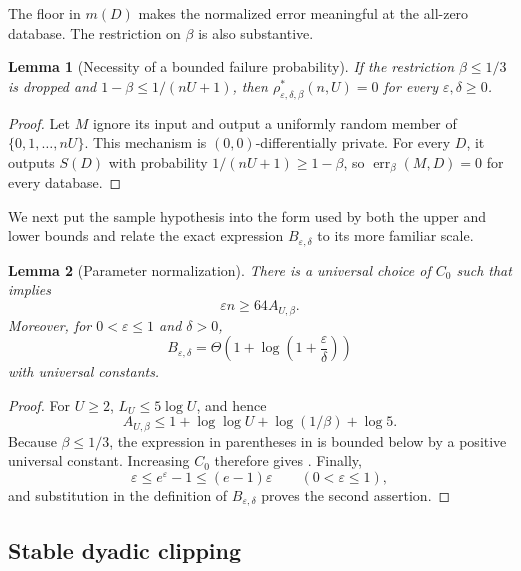 \documentclass[11pt]{article}
\newtheorem{lemma}{Lemma}[section]
\begin{document}
The floor in $m(D)$ makes the normalized error meaningful at the all-zero
database.  The restriction on $\beta$ is also substantive.

\begin{lemma}[Necessity of a bounded failure probability]
\label{lem:beta-counterexample}
If the restriction $\beta\le1/3$ is dropped and
$1-\beta\le1/(nU+1)$, then
$\rho^*_{\varepsilon,\delta,\beta}(n,U)=0$ for every
$\varepsilon,\delta\ge0$.
\end{lemma}

\begin{proof}
Let $M$ ignore its input and output a uniformly random member of
$\{0,1,\ldots,nU\}$.  This mechanism is $(0,0)$-differentially private.
For every $D$, it outputs $S(D)$ with probability
$1/(nU+1)\ge1-\beta$, so
$\operatorname{err}_{\beta}(M,D)=0$ for every database.
\end{proof}

We next put the sample hypothesis into the form used by both the upper and
lower bounds and relate the exact expression $B_{\varepsilon,\delta}$ to its
more familiar scale.

\begin{lemma}[Parameter normalization]
\label{lem:parameter-bookkeeping}
There is a universal choice of $C_0$ such that
 implies
\begin{equation}
 \varepsilon n\ge64A_{U,\beta}.
 \label{eq:normalized-sample}
\end{equation}
Moreover, for $0<\varepsilon\le1$ and $\delta>0$,
\[
 B_{\varepsilon,\delta}
 =\Theta\left(1+\log\left(1+\frac{\varepsilon}{\delta}\right)\right)
\]
with universal constants.
\end{lemma}

\begin{proof}
For $U\ge2$, $L_U\le5\log U$, and hence
\[
 A_{U,\beta}
 \le1+\log\log U+\log(1/\beta)+\log5.
\]
Because $\beta\le1/3$, the expression in parentheses in
 is bounded below by a positive universal
constant.  Increasing $C_0$ therefore gives
.  Finally,
\[
 \varepsilon\le e^\varepsilon-1\le(e-1)\varepsilon
 \qquad(0<\varepsilon\le1),
\]
and substitution in the definition of $B_{\varepsilon,\delta}$ proves the
second assertion.
\end{proof}

\subsection{Stable dyadic clipping}
\end{document}
